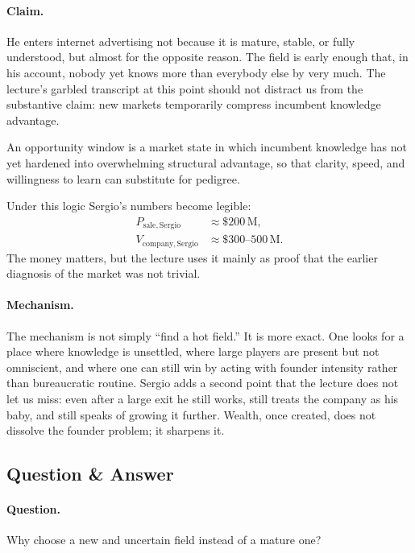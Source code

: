\paragraph{Claim.}
He enters internet advertising not because it is mature, stable, or fully understood, but almost for the opposite reason. The field is early enough that, in his account, nobody yet knows more than everybody else by very much. The lecture's garbled transcript at this point should not distract us from the substantive claim: new markets temporarily compress incumbent knowledge advantage.

\begin{definition}
An opportunity window is a market state in which incumbent knowledge has not yet hardened into overwhelming structural advantage, so that clarity, speed, and willingness to learn can substitute for pedigree.
\end{definition}

Under this logic Sergio's numbers become legible:
\begin{align}
P_{\mathrm{sale,Sergio}} &\approx \$200\,\mathrm{M},\\
V_{\mathrm{company,Sergio}} &\approx \$300\text{--}500\,\mathrm{M}.
\end{align}
The money matters, but the lecture uses it mainly as proof that the earlier diagnosis of the market was not trivial.

\paragraph{Mechanism.}
The mechanism is not simply ``find a hot field.'' It is more exact. One looks for a place where knowledge is unsettled, where large players are present but not omniscient, and where one can still win by acting with founder intensity rather than bureaucratic routine. Sergio adds a second point that the lecture does not let us miss: even after a large exit he still works, still treats the company as his baby, and still speaks of growing it further. Wealth, once created, does not dissolve the founder problem; it sharpens it.

\subsection{Question \& Answer}

\paragraph{Question.}
Why choose a new and uncertain field instead of a mature one?


